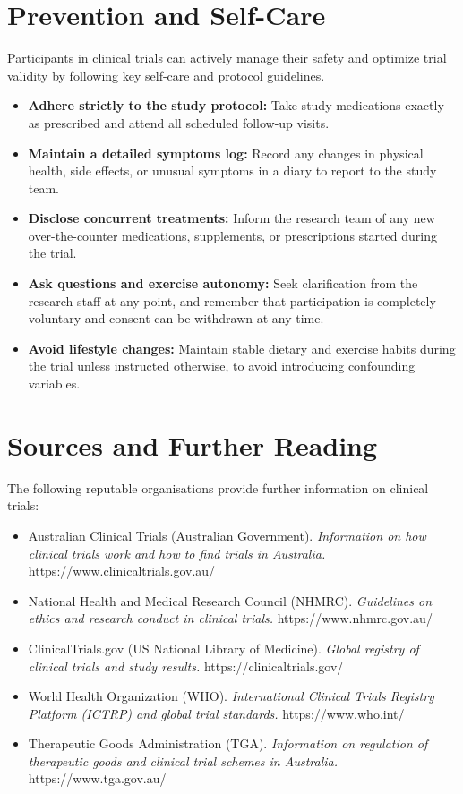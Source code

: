 \section*{Prevention and Self-Care}
Participants in clinical trials can actively manage their safety and optimize trial validity by following key self-care and protocol guidelines.
\begin{itemize}
    \item \textbf{Adhere strictly to the study protocol:} Take study medications exactly as prescribed and attend all scheduled follow-up visits.
    \item \textbf{Maintain a detailed symptoms log:} Record any changes in physical health, side effects, or unusual symptoms in a diary to report to the study team.
    \item \textbf{Disclose concurrent treatments:} Inform the research team of any new over-the-counter medications, supplements, or prescriptions started during the trial.
    \item \textbf{Ask questions and exercise autonomy:} Seek clarification from the research staff at any point, and remember that participation is completely voluntary and consent can be withdrawn at any time.
    \item \textbf{Avoid lifestyle changes:} Maintain stable dietary and exercise habits during the trial unless instructed otherwise, to avoid introducing confounding variables.
\end{itemize}

\section*{Sources and Further Reading}
The following reputable organisations provide further information on clinical trials:
\begin{itemize}
    \item Australian Clinical Trials (Australian Government). \textit{Information on how clinical trials work and how to find trials in Australia.} https://www.clinicaltrials.gov.au/
    \item National Health and Medical Research Council (NHMRC). \textit{Guidelines on ethics and research conduct in clinical trials.} https://www.nhmrc.gov.au/
    \item ClinicalTrials.gov (US National Library of Medicine). \textit{Global registry of clinical trials and study results.} https://clinicaltrials.gov/
    \item World Health Organization (WHO). \textit{International Clinical Trials Registry Platform (ICTRP) and global trial standards.} https://www.who.int/
    \item Therapeutic Goods Administration (TGA). \textit{Information on regulation of therapeutic goods and clinical trial schemes in Australia.} https://www.tga.gov.au/
\end{itemize}
